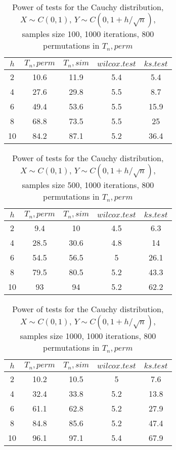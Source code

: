 \documentclass{report}
\begin{document}
\begin{longtable}{|c|c|c|c|c|}
  \caption{Power of tests for the Cauchy distribution, \\
           $X\sim C(0,1)$, $Y\sim C(0, 1 + h/\sqrt{n})$, \\
           samples size 100, 1000 iterations, 800 permutations in $T_n, perm$} \\
  \hline
  $h$ & $T_n, perm$ & $T_n, sim$ & $wilcox.test$ & $ks.test$ \\
  \hline
  2 & 10.6 & 11.9 & 5.4 & 5.4 \\
  4 & 27.6 & 29.8 & 5.5 & 8.7 \\
  6 & 49.4 & 53.6 & 5.5 & 15.9 \\
  8 & 68.8 & 73.5 & 5.5 & 25 \\
  10 & 84.2 & 87.1 & 5.2 & 36.4 \\
  \hline
\end{longtable}

\begin{longtable}{|c|c|c|c|c|}
  \caption{Power of tests for the Cauchy distribution, \\
           $X\sim C(0,1)$, $Y\sim C(0, 1 + h/\sqrt{n})$, \\
           samples size 500, 1000 iterations, 800 permutations in $T_n, perm$} \\
  \hline
  $h$ & $T_n, perm$ & $T_n, sim$ & $wilcox.test$ & $ks.test$ \\
  \hline
  2 & 9.4 & 10 & 4.5 & 6.3 \\
  4 & 28.5 & 30.6 & 4.8 & 14 \\
  6 & 54.5 & 56.5 & 5 & 26.1 \\
  8 & 79.5 & 80.5 & 5.2 & 43.3 \\
  10 & 93 & 94 & 5.2 & 62.2 \\
  \hline
\end{longtable}

\begin{longtable}{|c|c|c|c|c|}
  \caption{Power of tests for the Cauchy distribution, \\
           $X\sim C(0,1)$, $Y\sim C(0, 1 + h/\sqrt{n})$, \\
           samples size 1000, 1000 iterations, 800 permutations in $T_n, perm$} \\
  \hline
  $h$ & $T_n, perm$ & $T_n, sim$ & $wilcox.test$ & $ks.test$ \\
  \hline
  2 & 10.2 & 10.5 & 5 & 7.6 \\
  4 & 32.4 & 33.8 & 5.2 & 13.8 \\
  6 & 61.1 & 62.8 & 5.2 & 27.9 \\
  8 & 84.8 & 85.6 & 5.2 & 47.4 \\
  10 & 96.1 & 97.1 & 5.4 & 67.9 \\
  \hline
\end{longtable}
\end{document}
